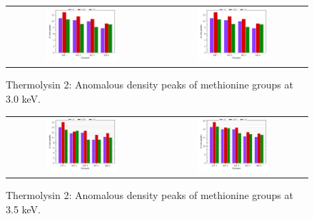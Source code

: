 \begin{figure}
    \centering
    \begin{tabular}{cc}
        \includegraphics[width = 0.5\textwidth]{plots/exp1/tlys_2_P6122/peaks/3p0_met120.pdf} & \includegraphics[width = 0.5\textwidth]{plots/exp1/tlys_2_P6122/peaks/3p0_met120.pdf}
    \end{tabular}
    \caption{Thermolysin 2: Anomalous density peaks of methionine groups at 3.0 \unit{keV}.}
    \label{fig:tlys2_met_peaks_3p0}
\end{figure}

\begin{figure}
    \centering
    \begin{tabular}{cc}
        \includegraphics[width = 0.5\textwidth]{plots/exp1/tlys_2_P6122/peaks/3p5_met120.pdf} & \includegraphics[width = 0.5\textwidth]{plots/exp1/tlys_2_P6122/peaks/3p5_met250.pdf}
    \end{tabular}
    \caption{Thermolysin 2: Anomalous density peaks of methionine groups at 3.5 \unit{keV}.}
    \label{fig:tlys2_met_peaks_3p5}
\end{figure}

